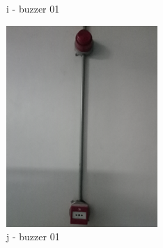 \begin{figure}[!h]
\begin{minipage}[b]{0.22\linewidth}
		\caption*{i - buzzer 01}
	\end{minipage}
	\hspace{0.03cm}
	\begin{minipage}[b]{0.22\linewidth}
		\centering
		\includegraphics[width=\textwidth]{figures/ch05_fdas_buzzer02}
		\caption*{j - buzzer 01}
	\end{minipage}
	\hspace{0.03cm}
	\begin{minipage}[b]{0.22\linewidth}
		\centering

\end{minipage}
\end{figure}
